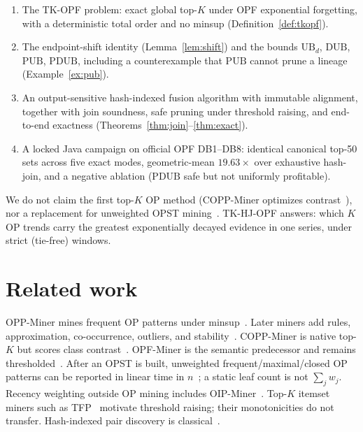 \documentclass[preprint,12pt]{elsarticle}
\newcommand{\DUB}{\mathrm{DUB}}
\newcommand{\PDUB}{\mathrm{PDUB}}
\newcommand{\PUB}{\mathrm{PUB}}
\newcommand{\UB}{\mathrm{UB}}
\theoremstyle{plain}
\theoremstyle{definition}
\theoremstyle{remark}
\begin{document}
\begin{enumerate}
\item The TK-OPF problem: exact global top-$K$ under OPF exponential forgetting, with a deterministic total order and no minsup (Definition~\ref{def:tkopf}).
\item The endpoint-shift identity (Lemma~\ref{lem:shift}) and the bounds $\UB_d$, $\DUB$, $\PUB$, $\PDUB$, including a counterexample that $\PUB$ cannot prune a lineage (Example~\ref{ex:pub}).
\item An output-sensitive hash-indexed fusion algorithm with immutable alignment, together with join soundness, safe pruning under threshold raising, and end-to-end exactness (Theorems~\ref{thm:join}--\ref{thm:exact}).
\item A locked Java campaign on official OPF DB1--DB8: identical canonical top-50 sets across five exact modes, geometric-mean $19.63\times$ over exhaustive hash-join, and a negative ablation ($\PDUB$ safe but not uniformly profitable).
\end{enumerate}

We do not claim the first top-$K$ OP method (COPP-Miner optimizes contrast~\cite{Wu2024COPP}), nor a replacement for unweighted OPST mining~\cite{Li2026Indexing}. TK-HJ-OPF answers: which $K$ OP trends carry the greatest exponentially decayed evidence in one series, under strict (tie-free) windows.

\section{Related work}
\label{sec:related}

OPP-Miner mines frequent OP patterns under minsup~\cite{Wu2023OPP}. Later miners add rules, approximation, co-occurrence, outliers, and stability~\cite{Wu2023OPR,Li2022AOP,Wu2024COP,Wu2025OUTO,Zhang2026SOPP}. COPP-Miner is native top-$K$ but scores class contrast~\cite{Wu2024COPP}. OPF-Miner is the semantic predecessor and remains thresholded~\cite{Li2024OPF}. After an OPST is built, unweighted frequent/maximal/closed OP patterns can be reported in linear time in $n$~\cite{Li2024Scalable,Li2026Indexing}; a static leaf count is not $\sum_j w_j$. Recency weighting outside OP mining includes OIP-Miner~\cite{Wu2025OIP}. Top-$K$ itemset miners such as TFP~\cite{Wang2005TFP} motivate threshold raising; their monotonicities do not transfer. Hash-indexed pair discovery is classical~\cite{Park1995DHP,Balkesen2013}.
\end{document}
